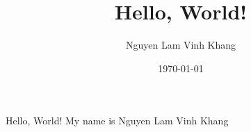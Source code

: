 \documentclass{article}
\title{Hello, World!}
\author{Nguyen Lam Vinh Khang}
\date{\today}
\begin{document}
Hello, World!
My name is Nguyen Lam Vinh Khang
\end{document}

